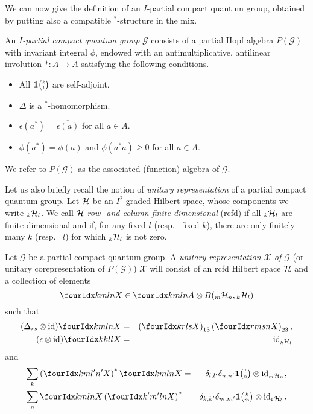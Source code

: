 We can now give the definition of an $I$-partial compact quantum group, obtained by putting also a compatible $^*$-structure in the mix.

\begin{Def} An \emph{$I$-partial compact quantum group} $\mathscr{G}$ consists of a partial Hopf algebra $P(\mathscr{G})$ with invariant integral $\phi$, endowed with an antimultiplicative, antilinear involution $*:A\rightarrow A$ satisfying the following conditions.
\begin{itemize}
\item All $\mathbf{1}{\tiny {\begin{pmatrix} k\\l\end{pmatrix}}}$ are self-adjoint.
\item $\Delta$ is a $^*$-homomorphism.
\item $\epsilon(a^*) = \overline{\epsilon(a)}$ for all $a\in A$. 
\item $\phi(a^*) = \overline{\phi(a)}$ and $\phi(a^*a)\geq 0$ for all $a\in A$.
\end{itemize}
\end{Def} 

We refer to $P(\mathscr{G})$ as the associated (function) algebra of $\mathscr{G}$.

Let us also briefly recall the notion of \emph{unitary representation} of a partial compact quantum group. Let $\mathcal{H}$ be an $I^2$-graded Hilbert space, whose components we write ${}_{k}\mathcal{H}_{l}$. We call $\mathcal{H}$ \emph{row- and column finite dimensional} (rcfd) if all ${}_{k}\mathcal{H}_{l}$ are finite dimensional and if, for any fixed $l$ (resp.~ fixed $k$), there are only finitely many $k$ (resp.~ $l$) for which ${}_{k}\mathcal{H}_{l}$ is not zero.  

\begin{Def}\label{DefUniCorep} Let $\mathscr{G}$ be a partial compact quantum group. A \emph{unitary representation $\mathscr{X}$ of $\mathscr{G}$} (or unitary corepresentation of $P(\mathscr{G})$) $\mathscr{X}$ will consist of an rcfd Hilbert space $\mathcal{H}$ and a collection of elements \[\Gr{X}{k}{l}{m}{n}\in \Gr{A}{k}{l}{m}{n}\otimes B(\GrDA{\Hsp}{m}{n},\GrDA{\Hsp}{k}{l})\] such that \begin{eqnarray*} (\Delta_{rs}\otimes \id)\Gr{X}{k}{l}{m}{n} &=& \left(\Gr{X}{k}{l}{r}{s}\right)_{13}\left(\Gr{X}{r}{s}{m}{n}\right)_{23},\\ (\epsilon\otimes \id)\Gr{X}{k}{l}{k}{l} &=& \id_{\GrDA{\Hsp}{k}{l}}\end{eqnarray*} and \begin{eqnarray*} \sum_{k} \left(\Gr{X}{k}{l'}{m}{n'}\right)^*\Gr{X}{k}{l}{m}{n} &=& \delta_{l,l'}  \delta_{n,n'} \UnitC{l}{n}\otimes \id_{\GrDA{\Hsp}{m}{n}},\\ \sum_{n} \Gr{X}{k}{l}{m}{n}\left(\Gr{X}{k'}{l}{m'}{n}\right)^* &=& \delta_{k,k'}\delta_{m,m'} \UnitC{k}{m}\otimes \id_{\GrDA{\Hsp}{k}{l}}.\end{eqnarray*}
\end{Def} 

